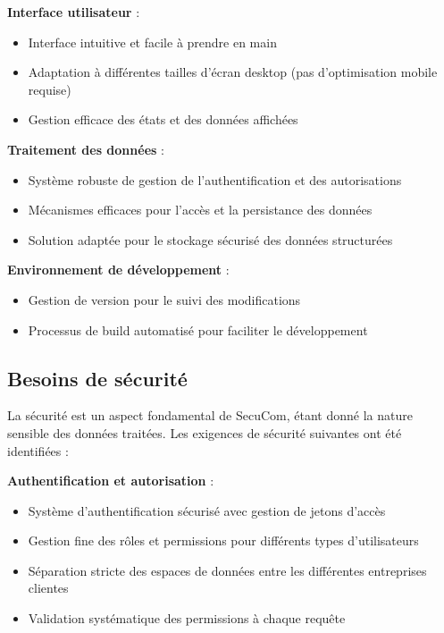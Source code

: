 \vspace{0.5cm}
\textbf{Interface utilisateur} :
\begin{itemize}[leftmargin=*,label=\textcolor{darkgray}{$\bullet$},itemsep=0.3em]
  \item Interface intuitive et facile à prendre en main
  \item Adaptation à différentes tailles d'écran desktop (pas d'optimisation mobile requise)
  \item Gestion efficace des états et des données affichées
\end{itemize}


\vspace{0.5cm}
\textbf{Traitement des données} :
\begin{itemize}[leftmargin=*,label=\textcolor{darkgray}{$\bullet$},itemsep=0.3em]
  \item Système robuste de gestion de l'authentification et des autorisations
  \item Mécanismes efficaces pour l'accès et la persistance des données
  \item Solution adaptée pour le stockage sécurisé des données structurées
\end{itemize}


\vspace{0.5cm}
\textbf{Environnement de développement} :
\begin{itemize}[leftmargin=*,label=\textcolor{darkgray}{$\bullet$},itemsep=0.3em]
  \item Gestion de version pour le suivi des modifications
  \item Processus de build automatisé pour faciliter le développement
\end{itemize}

\subsection{Besoins de sécurité}

La sécurité est un aspect fondamental de SecuCom, étant donné la nature sensible des données traitées. Les exigences de sécurité suivantes ont été identifiées :


\vspace{0.5cm}
\textbf{Authentification et autorisation} :
\begin{itemize}[leftmargin=*,label=\textcolor{darkgray}{$\bullet$},itemsep=0.3em]
  \item Système d'authentification sécurisé avec gestion de jetons d'accès
  \item Gestion fine des rôles et permissions pour différents types d'utilisateurs
  \item Séparation stricte des espaces de données entre les différentes entreprises clientes
  \item Validation systématique des permissions à chaque requête
\end{itemize}


